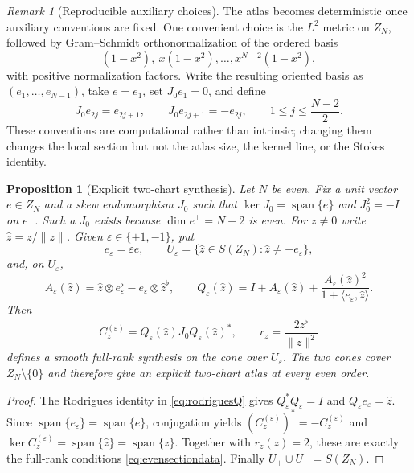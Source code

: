 \documentclass[11pt,a4paper]{article}
\newtheorem{proposition}[theorem]{Proposition}
\theoremstyle{definition}
\theoremstyle{remark}
\newtheorem{remark}[theorem]{Remark}
\newcommand{\Ker}{\operatorname{ker}}
\newcommand{\spanof}{\operatorname{span}}
\begin{document}
\begin{remark}[Reproducible auxiliary choices]\label{rem:reproduciblechoices}
The atlas becomes deterministic once auxiliary conventions are fixed.  One convenient choice
is the $L^2$ metric on $Z_N$, followed by Gram--Schmidt orthonormalization of the ordered
basis
\[
 (1-x^2),\ x(1-x^2),\ldots,x^{N-2}(1-x^2),
\]
with positive normalization factors.  Write the resulting oriented basis as
$(e_1,\ldots,e_{N-1})$, take $e=e_1$, set $J_0e_1=0$, and define
\[
 J_0e_{2j}=e_{2j+1},\qquad
 J_0e_{2j+1}=-e_{2j},
 \qquad 1\leq j\leq\frac{N-2}{2}.
\]
These conventions are computational rather than intrinsic; changing them changes the local
section but not the atlas size, the kernel line, or the Stokes identity.
\end{remark}

\begin{proposition}[Explicit two-chart synthesis]\label{prop:explicittwocharts}
Let $N$ be even.  Fix a unit vector $e\in Z_N$ and a skew endomorphism $J_0$ such that
$\Ker J_0=\spanof\{e\}$ and $J_0^2=-I$ on $e^\perp$.  Such a $J_0$ exists because
$\dim e^\perp=N-2$ is even.  For $z\neq0$ write
$\widehat z=z/\|z\|$.  Given $\varepsilon\in\{+1,-1\}$, put
\begin{equation}\label{eq:rodriguesdata}
 e_\varepsilon=\varepsilon e,\qquad
 U_\varepsilon=\{\widehat z\in S(Z_N):\widehat z\neq-e_\varepsilon\},
\end{equation}
and, on $U_\varepsilon$,
\begin{equation}\label{eq:rodriguesQ}
 A_\varepsilon(\widehat z)
 =\widehat z\otimes e_\varepsilon^\flat
   -e_\varepsilon\otimes\widehat z^\flat,
 \qquad
 Q_\varepsilon(\widehat z)
 =I+A_\varepsilon(\widehat z)
   +\frac{A_\varepsilon(\widehat z)^2}
          {1+\langle e_\varepsilon,\widehat z\rangle}.
\end{equation}
Then
\begin{equation}\label{eq:explicittwocharts}
 C_z^{(\varepsilon)}
 =Q_\varepsilon(\widehat z)J_0Q_\varepsilon(\widehat z)^*,
 \qquad
 r_z=\frac{2z^\flat}{\|z\|^2}
\end{equation}
defines a smooth full-rank synthesis on the cone over $U_\varepsilon$.  The two cones cover
$Z_N\setminus\{0\}$ and therefore give an explicit two-chart atlas at every even order.
\end{proposition}

\begin{proof}
The Rodrigues identity in \eqref{eq:rodriguesQ} gives
$Q_\varepsilon^*Q_\varepsilon=I$ and
$Q_\varepsilon e_\varepsilon=\widehat z$.  Since
$\spanof\{e_\varepsilon\}=\spanof\{e\}$, conjugation yields
$(C_z^{(\varepsilon)})^*=-C_z^{(\varepsilon)}$ and
$\Ker C_z^{(\varepsilon)}=\spanof\{\widehat z\}=\spanof\{z\}$.
Together with $r_z(z)=2$, these are exactly the full-rank conditions
\eqref{eq:evensectiondata}.  Finally $U_+\cup U_-=S(Z_N)$.
\end{proof}
\end{document}
